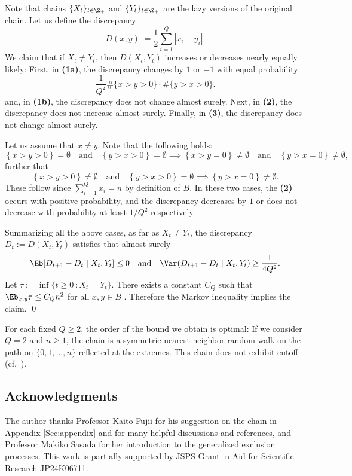 \documentclass[12pt, reqno]{amsart}
\begin{document}
Note that chains $\{X_t\}_{t\in \Z_+}$ and $\{Y_t\}_{t \in \Z_+}$ are the lazy versions of the original chain.
Let us define the discrepancy
\[
D(x, y):=\frac{1}{2}\sum_{i=1}^Q|x_i-y_i|.
\]
We claim that if $X_t\neq Y_t$,
then $D(X_t, Y_t)$ increases or decreases nearly equally likely:
First, in {\bf (1a)}, the discrepancy changes by $1$ or $-1$ with equal probability
\[
\frac{1}{Q^2}\#\{x>y>0\}\cdot\#\{y>x>0\}.
\]
and, in {\bf (1b)},
the discrepancy does not change almost surely.
Next, in {\bf (2)},
the discrepancy does not increase almost surely.
Finally, in {\bf (3)},
the discrepancy does not change almost surely.

Let us assume that $x \neq y$.
Note that the following holds:
\[
\left\{x>y>0\right\}=\emptyset\quad \text{and}\quad \left\{y>x>0\right\}=\emptyset \implies
\left\{x>y=0\right\}\neq \emptyset \quad \text{and} \quad \left\{y>x=0\right\}\neq \emptyset,
\]
further that
\[
\left\{x>y>0\right\}\neq \emptyset \quad \text{and} \quad \left\{y>x>0\right\}=\emptyset \implies \left\{y>x=0\right\}\neq \emptyset.
\]
These follow since $\sum_{i=1}^Qx_i=n$ by definition of $B$.
In these two cases,
the {\bf (2)} occurs with positive probability, and the discrepancy decreases by $1$ or does not decrease with probability at least $1/Q^2$ respectively.

Summarizing all the above cases,
as far as $X_t\neq Y_t$,
the discrepancy $D_t:=D(X_t, Y_t)$ satisfies that almost surely
\[
\Eb[D_{t+1}-D_t\mid X_t, Y_t]\le 0 \quad \text{and} \quad 
\Var(D_{t+1}-D_t\mid X_t, Y_t)\ge \frac{1}{4Q^2}.
\]
Let $\tau:=\inf\{t \ge 0 \ : X_t=Y_t\}$.
There exists a constant $C_Q$ such that $\Eb_{x, y}\tau \le C_Q n^2$ for all $x, y \in B$ \cite[Proposition 17.20]{LP}.
Therefore the Markov inequality implies the claim.
\qed

\begin{remark}\label{Eq:nocutoff}
For each fixed $Q\ge 2$,
the order of the bound we obtain is optimal:
If we consider $Q=2$ and $n \ge 1$,
the chain is a symmetric nearest neighbor random walk on the path on $\{0, 1, \dots, n\}$ reflected at the extremes.
This chain does not exhibit cutoff (cf.\ \cite[Chapter 18]{LP}). 
\end{remark}









\subsection*{Acknowledgments}
The author thanks Professor Kaito Fujii for his suggestion on the chain in Appendix \ref{Sec:appendix} and for many helpful discussions and references, and Professor Makiko Sasada for her introduction to the generalized exclusion processes.
This work is partially supported by 
JSPS Grant-in-Aid for Scientific Research JP24K06711.












\end{document}

